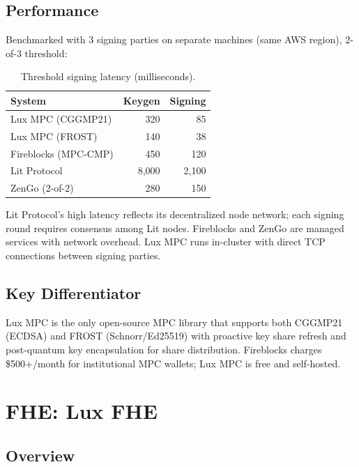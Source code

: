 \documentclass[11pt,twocolumn]{article}
\begin{document}
\subsection{Performance}

Benchmarked with 3 signing parties on separate machines (same AWS region), 2-of-3 threshold:

\begin{table}[H]
\centering
\caption{Threshold signing latency (milliseconds).}
\footnotesize
\begin{tabular}{@{}lrr@{}}
\toprule
System & Keygen & Signing \\
\midrule
Lux MPC (CGGMP21) & 320 & 85 \\
Lux MPC (FROST) & 140 & 38 \\
Fireblocks (MPC-CMP) & 450 & 120 \\
Lit Protocol & 8,000 & 2,100 \\
ZenGo (2-of-2) & 280 & 150 \\
\bottomrule
\end{tabular}
\end{table}

Lit Protocol's high latency reflects its decentralized node network; each signing round requires consensus among Lit nodes. Fireblocks and ZenGo are managed services with network overhead. Lux MPC runs in-cluster with direct TCP connections between signing parties.

\subsection{Key Differentiator}

Lux MPC is the only open-source MPC library that supports both CGGMP21 (ECDSA) and FROST (Schnorr/Ed25519) with proactive key share refresh and post-quantum key encapsulation for share distribution. Fireblocks charges \$500+/month for institutional MPC wallets; Lux MPC is free and self-hosted.

\section{FHE: Lux FHE}
\label{sec:fhe}

\subsection{Overview}
\end{document}
